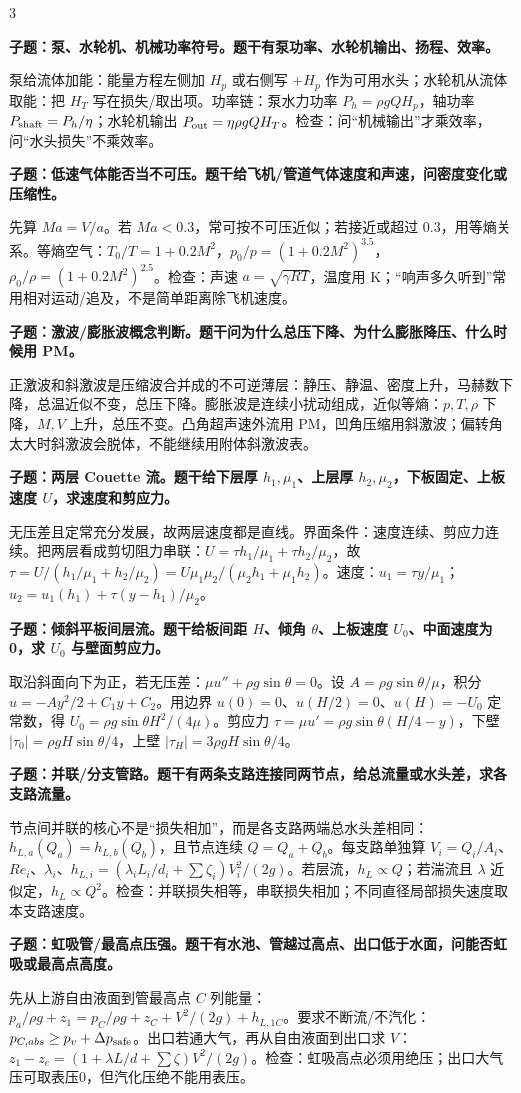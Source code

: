 \documentclass[a4paper]{article}
\newcommand{\qt}[1]{\vspace{0.04pt}\colorbox{Q}{\parbox{\dimexpr\linewidth-2\fboxsep}{\color{white}\bfseries #1}}\par}
\newcommand{\ans}[1]{\colorbox{G}{\parbox{\dimexpr\linewidth-2\fboxsep}{#1}}\par}
\begin{document}
\begin{multicols}{3}
\qt{子题：泵、水轮机、机械功率符号。题干有泵功率、水轮机输出、扬程、效率。}
\ans{泵给流体加能：能量方程左侧加 $H_p$ 或右侧写 $+H_p$ 作为可用水头；水轮机从流体取能：把 $H_T$ 写在损失/取出项。功率链：泵水力功率 $P_h=\rho gQH_p$，轴功率 $P_{\rm shaft}=P_h/\eta$；水轮机输出 $P_{\rm out}=\eta\rho gQH_T$。检查：问“机械输出”才乘效率，问“水头损失”不乘效率。}
\qt{子题：低速气体能否当不可压。题干给飞机/管道气体速度和声速，问密度变化或压缩性。}
\ans{先算 $Ma=V/a$。若 $Ma<0.3$，常可按不可压近似；若接近或超过 0.3，用等熵关系。等熵空气：$T_0/T=1+0.2M^2$，$p_0/p=(1+0.2M^2)^{3.5}$，$\rho_0/\rho=(1+0.2M^2)^{2.5}$。检查：声速 $a=\sqrt{\gamma RT}$，温度用 K；“响声多久听到”常用相对运动/追及，不是简单距离除飞机速度。}
\qt{子题：激波/膨胀波概念判断。题干问为什么总压下降、为什么膨胀降压、什么时候用 PM。}
\ans{正激波和斜激波是压缩波合并成的不可逆薄层：静压、静温、密度上升，马赫数下降，总温近似不变，总压下降。膨胀波是连续小扰动组成，近似等熵：$p,T,\rho$ 下降，$M,V$ 上升，总压不变。凸角超声速外流用 PM，凹角压缩用斜激波；偏转角太大时斜激波会脱体，不能继续用附体斜激波表。}
\qt{子题：两层 Couette 流。题干给下层厚 $h_1,\mu_1$、上层厚 $h_2,\mu_2$，下板固定、上板速度 $U$，求速度和剪应力。}
\ans{无压差且定常充分发展，故两层速度都是直线。界面条件：速度连续、剪应力连续。把两层看成剪切阻力串联：$U=\tau h_1/\mu_1+\tau h_2/\mu_2$，故 $\tau=U/(h_1/\mu_1+h_2/\mu_2)=U\mu_1\mu_2/(\mu_2h_1+\mu_1h_2)$。速度：$u_1=\tau y/\mu_1$；$u_2=u_1(h_1)+\tau(y-h_1)/\mu_2$。}
\qt{子题：倾斜平板间层流。题干给板间距 $H$、倾角 $\theta$、上板速度 $U_0$、中面速度为0，求 $U_0$ 与壁面剪应力。}
\ans{取沿斜面向下为正，若无压差：$\mu u''+\rho g\sin\theta=0$。设 $A=\rho g\sin\theta/\mu$，积分 $u=-Ay^2/2+C_1y+C_2$。用边界 $u(0)=0$、$u(H/2)=0$、$u(H)=-U_0$ 定常数，得 $U_0=\rho g\sin\theta H^2/(4\mu)$。剪应力 $\tau=\mu u'=\rho g\sin\theta(H/4-y)$，下壁 $|\tau_0|=\rho gH\sin\theta/4$，上壁 $|\tau_H|=3\rho gH\sin\theta/4$。}
\qt{子题：并联/分支管路。题干有两条支路连接同两节点，给总流量或水头差，求各支路流量。}
\ans{节点间并联的核心不是“损失相加”，而是各支路两端总水头差相同：$h_{L,a}(Q_a)=h_{L,b}(Q_b)$，且节点连续 $Q=Q_a+Q_b$。每支路单独算 $V_i=Q_i/A_i$、$Re_i$、$\lambda_i$、$h_{L,i}=(\lambda_iL_i/d_i+\sum\zeta_i)V_i^2/(2g)$。若层流，$h_L\propto Q$；若湍流且 $\lambda$ 近似定，$h_L\propto Q^2$。检查：并联损失相等，串联损失相加；不同直径局部损失速度取本支路速度。}
\qt{子题：虹吸管/最高点压强。题干有水池、管越过高点、出口低于水面，问能否虹吸或最高点高度。}
\ans{先从上游自由液面到管最高点 $C$ 列能量：$p_a/\rho g+z_1=p_C/\rho g+z_C+V^2/(2g)+h_{L,1C}$。要求不断流/不汽化：$p_{C,abs}\ge p_v+\Delta p_{\rm safe}$。出口若通大气，再从自由液面到出口求 $V$：$z_1-z_e=(1+\lambda L/d+\sum\zeta)V^2/(2g)$。检查：虹吸高点必须用绝压；出口大气压可取表压0，但汽化压绝不能用表压。}

\end{multicols}
\end{document}
